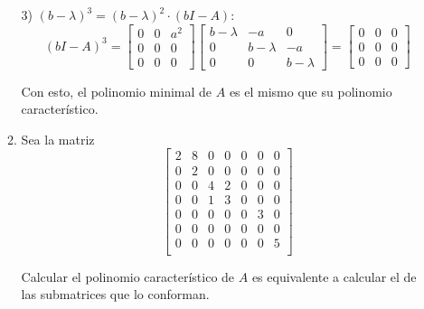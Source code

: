 \documentclass{report}
\begin{document}
\begin{enumerate}
\begin{enumerate}
                3) $(b-\lambda)^3 = (b-\lambda)^2 \cdot (bI - A)$:
                \[
                (bI - A)^3 = \begin{bmatrix}
                0 & 0 & a^2 \\
                0 & 0 & 0 \\
                0 & 0 & 0
                \end{bmatrix} \begin{bmatrix}
                b-\lambda & -a & 0 \\
                0 & b-\lambda & -a \\
                0 & 0 & b-\lambda
                \end{bmatrix} = \begin{bmatrix}
                0 & 0 & 0 \\
                0 & 0 & 0 \\
                0 & 0 & 0
                \end{bmatrix}
                \]

            Con esto, el polinomio minimal de $A$ es el mismo que su polinomio característico.

            \item Sea la matriz  $$\begin{bmatrix}
                2 & 8 & 0 & 0 & 0 & 0 & 0\\
                0 & 2 & 0 & 0 & 0 & 0 & 0\\
                0 & 0 & 4 & 2 & 0 & 0 & 0\\
                0 & 0 & 1 & 3 & 0 & 0 & 0\\
                0 & 0 & 0 & 0 & 0 & 3 & 0\\
                0 & 0 & 0 & 0 & 0 & 0 & 0\\
                0 & 0 & 0 & 0 & 0 & 0 & 5\\
            \end{bmatrix}$$

            Calcular el polinomio característico de $A$ es equivalente a calcular el de las submatrices que lo conforman.


\end{enumerate}
\end{enumerate}
\end{document}
